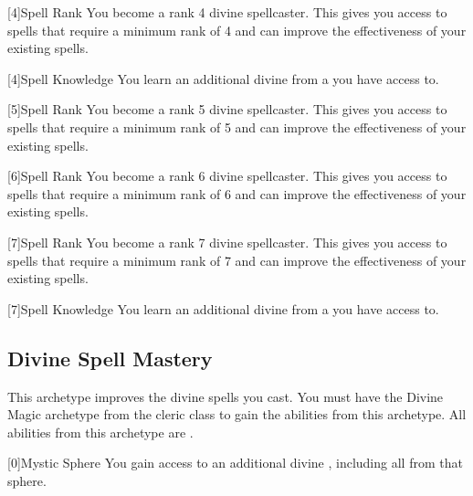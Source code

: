         [4]{Spell Rank} You become a rank 4 divine spellcaster.
        This gives you access to spells that require a minimum rank of 4 and can improve the effectiveness of your existing spells.

        [4]{Spell Knowledge} You learn an additional divine  from a  you have access to.

        [5]{Spell Rank} You become a rank 5 divine spellcaster.
        This gives you access to spells that require a minimum rank of 5 and can improve the effectiveness of your existing spells.

        [6]{Spell Rank} You become a rank 6 divine spellcaster.
        This gives you access to spells that require a minimum rank of 6 and can improve the effectiveness of your existing spells.

        [7]{Spell Rank} You become a rank 7 divine spellcaster.
        This gives you access to spells that require a minimum rank of 7 and can improve the effectiveness of your existing spells.

        [7]{Spell Knowledge} You learn an additional divine  from a  you have access to.

    \newpage
    \subsection{Divine Spell Mastery}
        This archetype improves the divine spells you cast.
        You must have the Divine Magic archetype from the cleric class to gain the abilities from this archetype.
        All abilities from this archetype are .

        [0]{Mystic Sphere} You gain access to an additional divine , including all  from that sphere.

